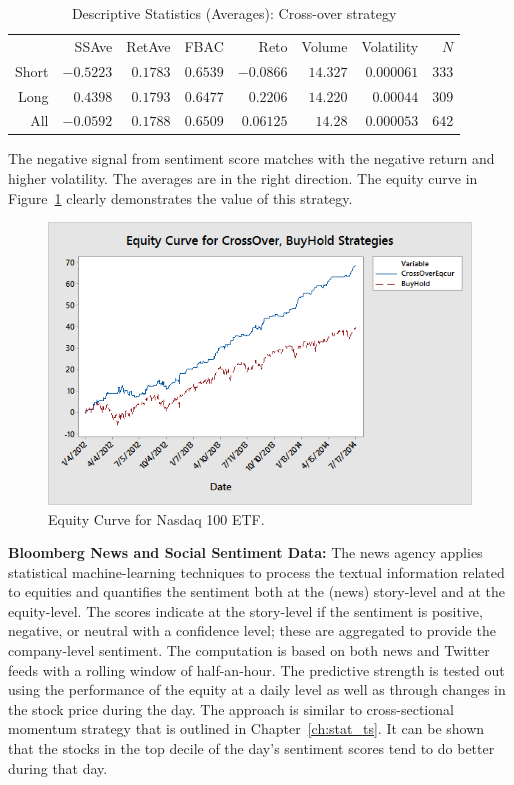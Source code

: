         \begin{table}[!ht]
        \centering
        \caption{Descriptive Statistics (Averages): Cross-over strategy \label{tab:descstatcross}}
        \begin{tabular}{rrrrrrrr}
         & SSAve & RetAve & FBAC & Reto & Volume & Volatility & $N$ \\
        Short  & $-0.5223$ & $0.1783$ & $0.6539$ & $-0.0866$ & $14.327$ & $0.000061$ & 333 \\
         Long & $0.4398$ & $0.1793$ & $0.6477$ & $0.2206$ & $14.220$ & $0.00044$ & 309 \\
         All & $-0.0592$ & $0.1788$ & $0.6509$ & $0.06125$ & $14.28$ & $0.000053$ & 642
        \end{tabular} 
        \end{table}

The negative signal from sentiment score matches with the negative return and higher volatility. The averages are in the right direction. The equity curve in Figure~\ref{fig:equitycross} clearly demonstrates the value of this strategy. \twomedskip

        \begin{figure}[!ht]
        \centering
        \includegraphics[width=\textwidth]{chapters/chapter_news_an/figures/ch4sec4equitycross} 
        \caption{Equity Curve for Nasdaq 100 ETF. \label{fig:equitycross}}
        \end{figure}

\noindent \textbf{Bloomberg News and Social Sentiment Data:} The news agency applies statistical machine-learning techniques to process the textual information related to equities and quantifies the sentiment both at the (news) story-level and at the equity-level. The scores indicate at the story-level if the sentiment is positive, negative, or neutral with a confidence level; these are aggregated to provide the company-level sentiment. The computation is based on both news and Twitter feeds with a rolling window of half-an-hour. The predictive strength is tested out using the performance of the equity at a daily level as well as through changes in the stock price during the day. The approach is similar to cross-sectional momentum strategy that is outlined in Chapter~\ref{ch:stat_ts}. It can be shown that the stocks in the top decile of the day's sentiment scores tend to do better during that day. 


